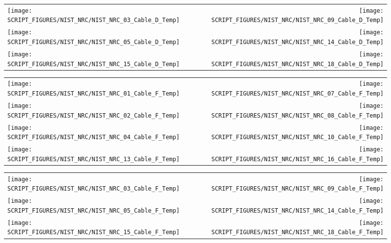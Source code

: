 \begin{figure}[p]
\begin{tabular*}{\textwidth}{l@{\extracolsep{\fill}}r}
\texttt{[image: SCRIPT\_FIGURES/NIST\_NRC/NIST\_NRC\_03\_Cable\_D\_Temp]} &
\texttt{[image: SCRIPT\_FIGURES/NIST\_NRC/NIST\_NRC\_09\_Cable\_D\_Temp]} \\
\texttt{[image: SCRIPT\_FIGURES/NIST\_NRC/NIST\_NRC\_05\_Cable\_D\_Temp]} &
\texttt{[image: SCRIPT\_FIGURES/NIST\_NRC/NIST\_NRC\_14\_Cable\_D\_Temp]} \\
\texttt{[image: SCRIPT\_FIGURES/NIST\_NRC/NIST\_NRC\_15\_Cable\_D\_Temp]} &
\texttt{[image: SCRIPT\_FIGURES/NIST\_NRC/NIST\_NRC\_18\_Cable\_D\_Temp]}
\end{tabular*}
\label{NIST_NRC_Cable_D_Open}
\end{figure}

\begin{figure}[p]
\begin{tabular*}{\textwidth}{l@{\extracolsep{\fill}}r}
\texttt{[image: SCRIPT\_FIGURES/NIST\_NRC/NIST\_NRC\_01\_Cable\_F\_Temp]} &
\texttt{[image: SCRIPT\_FIGURES/NIST\_NRC/NIST\_NRC\_07\_Cable\_F\_Temp]} \\
\texttt{[image: SCRIPT\_FIGURES/NIST\_NRC/NIST\_NRC\_02\_Cable\_F\_Temp]} &
\texttt{[image: SCRIPT\_FIGURES/NIST\_NRC/NIST\_NRC\_08\_Cable\_F\_Temp]} \\
\texttt{[image: SCRIPT\_FIGURES/NIST\_NRC/NIST\_NRC\_04\_Cable\_F\_Temp]} &
\texttt{[image: SCRIPT\_FIGURES/NIST\_NRC/NIST\_NRC\_10\_Cable\_F\_Temp]} \\
\texttt{[image: SCRIPT\_FIGURES/NIST\_NRC/NIST\_NRC\_13\_Cable\_F\_Temp]} &
\texttt{[image: SCRIPT\_FIGURES/NIST\_NRC/NIST\_NRC\_16\_Cable\_F\_Temp]}
\end{tabular*}
\label{NIST_NRC_Cable_F_Closed}
\end{figure}

\begin{figure}[p]
\begin{tabular*}{\textwidth}{l@{\extracolsep{\fill}}r}
\texttt{[image: SCRIPT\_FIGURES/NIST\_NRC/NIST\_NRC\_03\_Cable\_F\_Temp]} &
\texttt{[image: SCRIPT\_FIGURES/NIST\_NRC/NIST\_NRC\_09\_Cable\_F\_Temp]} \\
\texttt{[image: SCRIPT\_FIGURES/NIST\_NRC/NIST\_NRC\_05\_Cable\_F\_Temp]} &
\texttt{[image: SCRIPT\_FIGURES/NIST\_NRC/NIST\_NRC\_14\_Cable\_F\_Temp]} \\
\texttt{[image: SCRIPT\_FIGURES/NIST\_NRC/NIST\_NRC\_15\_Cable\_F\_Temp]} &
\texttt{[image: SCRIPT\_FIGURES/NIST\_NRC/NIST\_NRC\_18\_Cable\_F\_Temp]}
\end{tabular*}
\label{NIST_NRC_Cable_F_Open}
\end{figure}

